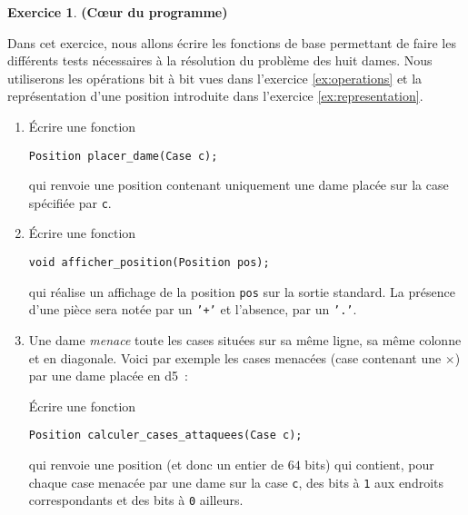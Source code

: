 \documentclass[12pt]{article}
\theoremstyle{definition}
\newtheorem{Exercice}{Exercice}
\begin{document}
\begin{Exercice}{\bf (C\oe ur du programme)}\smallskip

Dans cet exercice, nous allons écrire les fonctions de base permettant
de faire les différents tests nécessaires à la résolution du problème
des huit dames. Nous utiliserons les opérations bit à bit vues dans
l'exercice \ref{ex:operations} et la représentation d'une position
introduite dans l'exercice \ref{ex:representation}.
\begin{enumerate}
    \item Écrire une fonction
\begin{lstlisting}
Position placer_dame(Case c);
\end{lstlisting}
    qui renvoie une position contenant uniquement une dame placée sur
    la case spécifiée par {\tt c}.
    \smallskip

    \item Écrire une fonction
\begin{lstlisting}
void afficher_position(Position pos);
\end{lstlisting}
    qui réalise un affichage de la position {\tt pos} sur la sortie
    standard. La présence d'une pièce sera notée par un {\tt '+'} et
    l'absence, par un {\tt '.'}.
    \smallskip

    \item Une dame {\em menace} toute les cases situées sur sa même
    ligne, sa même colonne et en diagonale. Voici par exemple les
    cases menacées (case contenant une $\times$) par une dame placée
    en d5~:
    \begin{center}\showboard\end{center}

    Écrire une fonction
\begin{lstlisting}
Position calculer_cases_attaquees(Case c);
\end{lstlisting}
    qui renvoie une position (et donc un entier de $64$ bits) qui
    contient, pour chaque case menacée par une dame sur la case
    {\tt c}, des bits à {\tt 1} aux endroits correspondants et des
    bits à {\tt 0} ailleurs.
    \smallskip


\end{enumerate}
\end{Exercice}
\end{document}
